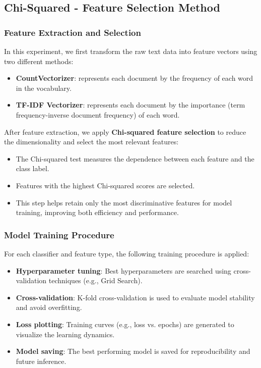 \subsection{Chi-Squared - Feature Selection Method}
\subsubsection{Feature Extraction and Selection}
In this experiment, we first transform the raw text data into feature vectors using two different methods:
\begin{itemize}
    \item \textbf{CountVectorizer}: represents each document by the frequency of each word in the vocabulary.
    \item \textbf{TF-IDF Vectorizer}: represents each document by the importance (term frequency-inverse document frequency) of each word.
\end{itemize}

After feature extraction, we apply \textbf{Chi-squared feature selection} to reduce the dimensionality and select the most relevant features:
\begin{itemize}
    \item The Chi-squared test measures the dependence between each feature and the class label.
    \item Features with the highest Chi-squared scores are selected.
    \item This step helps retain only the most discriminative features for model training, improving both efficiency and performance.
\end{itemize}

\subsubsection{Model Training Procedure}

For each classifier and feature type, the following training procedure is applied:
\begin{itemize}
    \item \textbf{Hyperparameter tuning}: Best hyperparameters are searched using cross-validation techniques (e.g., Grid Search).
    \item \textbf{Cross-validation}: K-fold cross-validation is used to evaluate model stability and avoid overfitting.
    \item \textbf{Loss plotting}: Training curves (e.g., loss vs. epochs) are generated to visualize the learning dynamics.
    \item \textbf{Model saving}: The best performing model is saved for reproducibility and future inference.
\end{itemize}

